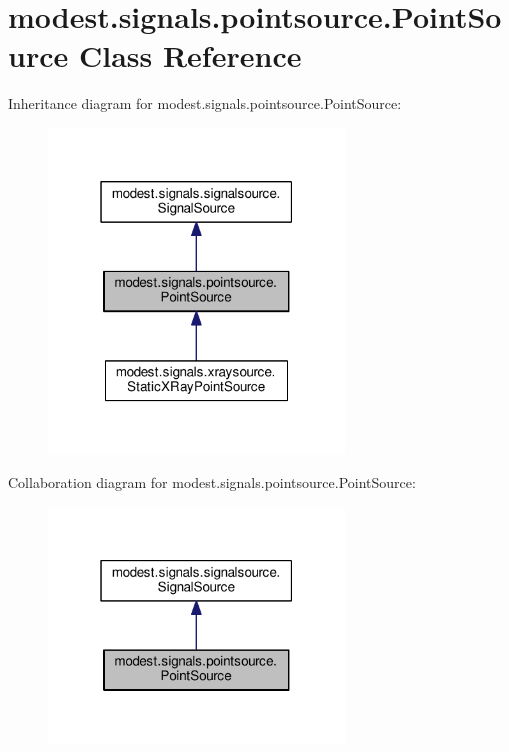 \hypertarget{classmodest_1_1signals_1_1pointsource_1_1PointSource}{}\section{modest.\+signals.\+pointsource.\+Point\+Source Class Reference}
\label{classmodest_1_1signals_1_1pointsource_1_1PointSource}


Inheritance diagram for modest.\+signals.\+pointsource.\+Point\+Source\+:
\nopagebreak
\begin{figure}[H]
\begin{center}
\leavevmode
\includegraphics[width=223pt]{classmodest_1_1signals_1_1pointsource_1_1PointSource__inherit__graph}
\end{center}
\end{figure}


Collaboration diagram for modest.\+signals.\+pointsource.\+Point\+Source\+:
\nopagebreak
\begin{figure}[H]
\begin{center}
\leavevmode
\includegraphics[width=223pt]{classmodest_1_1signals_1_1pointsource_1_1PointSource__coll__graph}
\end{center}
\end{figure}
